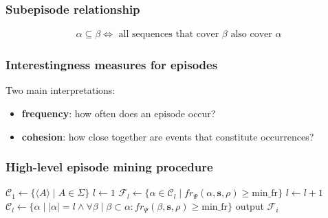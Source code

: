 \documentclass[dvipsnames]{beamer}
\begin{document}
\fi
\begin{frame}
\frametitle{Subepisode relationship}

\begin{align*}
\alpha \subseteq \beta \iff \text{ all sequences that cover } \beta \text{ also cover } \alpha
\end{align*}

\end{frame}
\begin{frame}
\frametitle{Interestingness measures for episodes}

Two main interpretations:

\begin{itemize}
\item \textbf{frequency}: how often does an episode occur?
\item \textbf{cohesion}: how close together are events that constitute occurrences?
\end{itemize}

\end{frame}
\begin{frame}
\frametitle{High-level episode mining procedure}

\begin{algorithmic}[1]

\State $ \mathcal{C}_1 \gets \{ \langle A \rangle \mid A \in \Sigma \} $
\State $ l \gets 1 $
    \State $ \mathcal{F}_l \gets \{ \alpha \in \mathcal{C}_l \mid fr_\Psi(\alpha, \boldsymbol{s}, \rho) \geq \text{min\_fr} \} $
    \State $ l \gets l + 1 $
    \State $ \mathcal{C}_l \gets \{ \alpha \mid | \alpha | = l \wedge \forall \beta \mid \beta \subset \alpha : fr_\Psi(\beta, \boldsymbol{s}, \rho) \geq \text{min\_fr} \} $
\EndWhile
{}
    \State output $ \mathcal{F}_i $
\EndFor

\end{algorithmic}

\end{frame}
\end{document}
